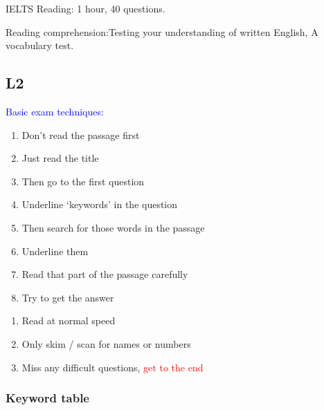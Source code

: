 \documentclass[12pt,a4paper]{article}
\begin{document}
IELTS Reading: 1 hour, 40 questions.

Reading comprehension:Testing your understanding of written English, 
A vocabulary test.


\subsection*{L2}

{\centering \textcolor{blue}{Basic exam techniques:}\par}

\begin{enumerate}[label=\arabic*., topsep=0pt]
    \item Don't read the passage first
    \item Just read the title
    \item Then go to the first question
    \item Underline `keywords' in the question
    \item Then search for those words in the passage
    \item Underline them
    \item Read that part of the passage carefully
    \item Try to get the answer
\end{enumerate}

\vspace{1em}

\begin{enumerate}[label=\arabic*., topsep=0pt]
    \item Read at normal speed
    \item Only skim / scan for names or numbers
    \item Miss any difficult questions, \textcolor{red}{get to the end}
\end{enumerate}


\subsubsection*{Keyword table}
\end{document}

